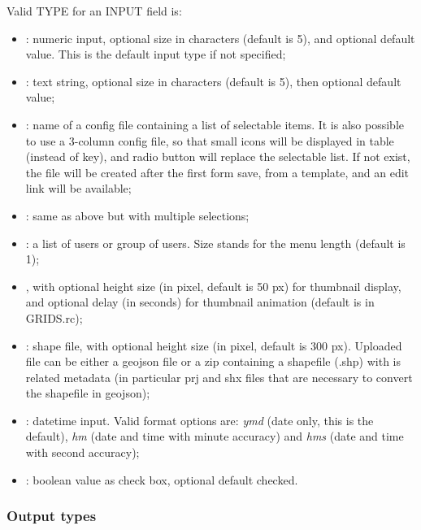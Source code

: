Valid TYPE for an INPUT field is:
\begin{itemize}
	\item {}: numeric input, optional size in characters (default is 5), and optional default value. This is the default input type if not specified;
	\item {} : text string, optional size in characters (default is 5), then optional default value;
	\item {}: name of a config file containing a  list of selectable items. It is also possible to use a  3-column config file, so that small icons will be displayed in table (instead of key), and radio button will replace the selectable list. If not exist, the file will be created after the first form save, from a template, and an edit link will be available;
	\item {}: same as above but with multiple selections;
	\item {}: a list of users or group of users. Size stands for the menu length (default is 1);
	\item {}, with optional height size (in pixel, default is 50 px) for thumbnail display, and optional delay (in seconds) for thumbnail animation (default is  in GRIDS.rc);
	\item {}: shape file, with optional height size (in pixel, default is 300 px). Uploaded file can be either a geojson file or a zip containing a shapefile (.shp) with is related metadata (in particular prj and shx files that are necessary to convert the shapefile in geojson);
	\item {}: datetime input. Valid format options are: \textit{ymd} (date only, this is the default), \textit{hm} (date and time with minute accuracy) and \textit{hms} (date and time with second accuracy);
	\item {}: boolean value as check box, optional default checked.
\end{itemize}

\subsubsection{Output types}


